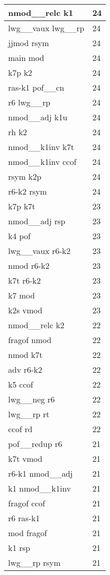 \documentclass[a4 paper]{article}
\begin{document}
\begin{longtable}{p{}p{}}
nmod\_\_relc k1  & 24 \\ \midrule
lwg\_\_vaux lwg\_\_rp  & 24 \\ \midrule
jjmod rsym  & 24 \\ \midrule
main mod  & 24 \\ \midrule
k7p k2  & 24 \\ \midrule
ras-k1 pof\_\_cn  & 24 \\ \midrule
r6 lwg\_\_rp  & 24 \\ \midrule
nmod\_\_adj k1u  & 24 \\ \midrule
rh k2  & 24 \\ \midrule
nmod\_\_k1inv k7t  & 24 \\ \midrule
nmod\_\_k1inv ccof  & 24 \\ \midrule
rsym k2p  & 24 \\ \midrule
r6-k2 rsym  & 24 \\ \midrule
k7p k7t  & 23 \\ \midrule
nmod\_\_adj rsp  & 23 \\ \midrule
k4 pof  & 23 \\ \midrule
lwg\_\_vaux r6-k2  & 23 \\ \midrule
nmod r6-k2  & 23 \\ \midrule
k7t r6-k2  & 23 \\ \midrule
k7 mod  & 23 \\ \midrule
k2s vmod  & 23 \\ \midrule
nmod\_\_relc k2  & 22 \\ \midrule
fragof nmod  & 22 \\ \midrule
nmod k7t  & 22 \\ \midrule
adv r6-k2  & 22 \\ \midrule
k5 ccof  & 22 \\ \midrule
lwg\_\_neg r6  & 22 \\ \midrule
lwg\_\_rp rt  & 22 \\ \midrule
ccof rd  & 22 \\ \midrule
pof\_\_redup r6  & 21 \\ \midrule
k7t vmod  & 21 \\ \midrule
r6-k1 nmod\_\_adj  & 21 \\ \midrule
k1 nmod\_\_k1inv  & 21 \\ \midrule
fragof ccof  & 21 \\ \midrule
r6 ras-k1  & 21 \\ \midrule
mod fragof  & 21 \\ \midrule
k1 rsp  & 21 \\ \midrule
lwg\_\_rp rsym  & 21 \\ \midrule

\end{longtable}
\end{document}

